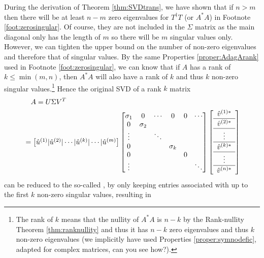 During the derivation of Theorem \ref{thm:SVDtrans}, we have shown that if $n > m$ then there will be at least $n-m$ zero eigenvalues for $T^\dag T$ (or $A^*A$) in Footnote \ref{foot:zerosingular}. Of course, they are not included in the $\Sigma$ matrix as the main diagonal only has the length of $m$ so there will be $m$ singular values only. However, we can tighten the upper bound on the number of non-zero eigenvalues and therefore that of singular values. By the same Properties \ref{proper:AdagArank} used in Footnote \ref{foot:zerosingular}, we can know that if $A$ has a rank of $k \leq \min(m,n)$, then $A^*A$ will also have a rank of $k$ and thus $k$ non-zero singular values.\footnote{The rank of $k$ means that the nullity of $A^*A$ is $n-k$ by the Rank-nullity Theorem \ref{thm:ranknullity} and thus it has $n-k$ zero eigenvalues and thus $k$ non-zero eigenvalues (we implicitly have used Properties \ref{proper:symnodefic}, adapted for complex matrices, can you see how?).} Hence the original SVD of a rank $k$ matrix
\begin{align}
&\quad A = U\Sigma V^T \nonumber \\
&= \begin{bmatrix}
\hat{u}^{(1)} | \hat{u}^{(2)} | \cdots | \hat{u}^{(k)} | \cdots | \hat{u}^{(m)}
\end{bmatrix}
\begin{bmatrix}
\sigma_1 & 0 & \cdots & 0 & 0 & \cdots \\
0 & \sigma_2 & & \\
\vdots & & \ddots &\\
0 & & & \sigma_k & \\
0 & & & & 0 & \\
\vdots & & & & & \ddots
\end{bmatrix}
\left[\begin{array}{c} 
\hat{v}^{(1)*} \\
\hline
\hat{v}^{(2)*} \Tstrut \\
\hline
\vdots \\
\hline 
\hat{v}^{(k)*} \Tstrut \\
\hline
\vdots \\
\hline
\hat{v}^{(n)*} \Tstrut
\end{array}\right] 
\end{align}
can be reduced to the so-called , by only keeping entries associated with up to the first $k$ non-zero singular values, resulting in
